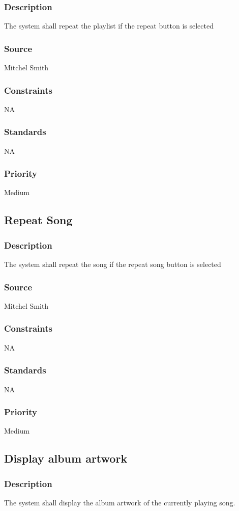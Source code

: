 \subsubsection{Description}
The system shall repeat the playlist if the repeat button is selected 
\subsubsection{Source}
Mitchel Smith
\subsubsection{Constraints}
NA
\subsubsection{Standards}
NA
\subsubsection{Priority}
Medium


\subsection{Repeat Song}
\subsubsection{Description}
The system shall repeat the song if the repeat song button is selected 
\subsubsection{Source}
Mitchel Smith
\subsubsection{Constraints}
NA
\subsubsection{Standards}
NA
\subsubsection{Priority}
Medium


\subsection{Display album artwork}
\subsubsection{Description}
The system shall display the album artwork of the currently playing song.

